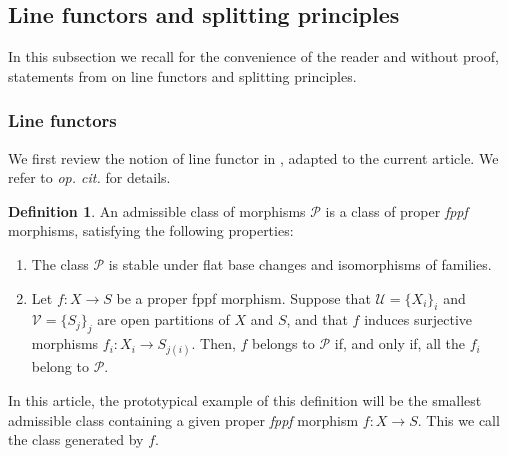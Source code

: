 \documentclass[JEP,XML,SOM,Unicode,published]{cedram}
\theoremstyle{plain}
\theoremstyle{definition}
\newtheorem{definition}[theorem]{Definition}
\newcommand{\Pcal}{\mathcal P}
\newcommand{\Ucal}{\mathcal U}
\newcommand{\Vcal}{\mathcal V}
\newcommand{\fppf}{\emph{fppf}\xspace}
\begin{document}
\subsection{Line functors and splitting principles}\label{subsubsec:line-functors}
In this subsection we recall for the convenience of the reader and without proof, statements from \cite[\S 2]{Eriksson-Freixas-Wentworth} on line functors and splitting principles.

\subsubsection{Line functors}
We first review the notion of line functor in \cite[Def.\,2.1]{Eriksson-Freixas-Wentworth}, adapted to the current article. We refer to \emph{op. cit.} for details.

\begin{definition}\label{def:admissible-class}
An admissible class of morphisms $\Pcal$ is a class of proper \fppf morphisms, satisfying the following properties:
\begin{enumerate}
\item[$(P_1)$] The class $\Pcal$ is stable under flat base changes and isomorphisms of families.
\item[$(P_2)$] Let $f\colon X\to S$ be a proper fppf morphism. Suppose that $\Ucal=\lbrace X_{i}\rbrace_{i}$ and $\Vcal=\lbrace S_{j}\rbrace_{j}$ are open partitions of $X$ and $S$, and that $f$ induces surjective morphisms $f_{i}\colon X_{i}\to S_{j(i)}$. Then, $f$ belongs to $\Pcal$ if, and only if, all the $f_{i}$ belong to $\Pcal$.
\end{enumerate}

\end{definition}
In this article, the prototypical example of this definition will be the smallest admissible class containing a given proper \fppf morphism $f\colon X\to S$. This we call the class generated by $f$.
\end{document}
